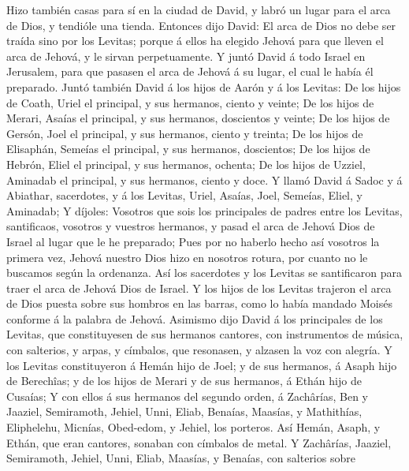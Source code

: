  Hizo también casas para sí en la ciudad de David, y labró
un lugar para el arca de Dios, y tendióle una tienda. 
Entonces dijo David: El arca de Dios no debe ser traída sino por los
Levitas; porque á ellos ha elegido Jehová para que lleven el arca de
Jehová, y le sirvan perpetuamente.  Y juntó David á todo
Israel en Jerusalem, para que pasasen el arca de Jehová á su lugar, el
cual le había él preparado.  Juntó también David á los hijos
de Aarón y á los Levitas:  De los hijos de Coath, Uriel el
principal, y sus hermanos, ciento y veinte;  De los hijos de
Merari, Asaías el principal, y sus hermanos, doscientos y veinte;
 De los hijos de Gersón, Joel el principal, y sus hermanos,
ciento y treinta;  De los hijos de Elisaphán, Semeías el
principal, y sus hermanos, doscientos;  De los hijos de
Hebrón, Eliel el principal, y sus hermanos, ochenta;  De
los hijos de Uzziel, Aminadab el principal, y sus hermanos, ciento y
doce.  Y llamó David á Sadoc y á Abiathar, sacerdotes, y á
los Levitas, Uriel, Asaías, Joel, Semeías, Eliel, y Aminadab;
 Y díjoles: Vosotros que sois los principales de padres
entre los Levitas, santificaos, vosotros y vuestros hermanos, y pasad el
arca de Jehová Dios de Israel al lugar que le he preparado;
 Pues por no haberlo hecho así vosotros la primera vez,
Jehová nuestro Dios hizo en nosotros rotura, por cuanto no le buscamos
según la ordenanza.  Así los sacerdotes y los Levitas se
santificaron para traer el arca de Jehová Dios de Israel. 
Y los hijos de los Levitas trajeron el arca de Dios puesta sobre sus
hombros en las barras, como lo había mandado Moisés conforme á la
palabra de Jehová.  Asimismo dijo David á los principales
de los Levitas, que constituyesen de sus hermanos cantores, con
instrumentos de música, con salterios, y arpas, y címbalos, que
resonasen, y alzasen la voz con alegría.  Y los Levitas
constituyeron á Hemán hijo de Joel; y de sus hermanos, á Asaph hijo de
Berechîas; y de los hijos de Merari y de sus hermanos, á Ethán hijo de
Cusaías;  Y con ellos á sus hermanos del segundo orden, á
Zachârías, Ben y Jaaziel, Semiramoth, Jehiel, Unni, Eliab, Benaías,
Maasías, y Mathithías, Eliphelehu, Micnías, Obed-edom, y Jehiel, los
porteros.  Así Hemán, Asaph, y Ethán, que eran cantores,
sonaban con címbalos de metal.  Y Zachârías, Jaaziel,
Semiramoth, Jehiel, Unni, Eliab, Maasías, y Benaías, con salterios sobre
